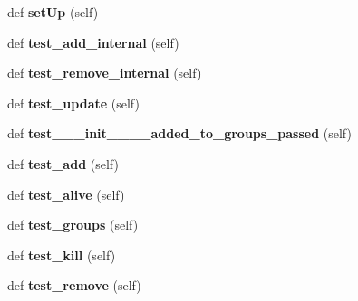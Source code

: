 \begin{DoxyCompactItemize}
\item 
\mbox{\label{classpygame_1_1tests_1_1sprite__test_1_1_sprite_base_ab02727979a1981d7452d4f9dbb3757b3}} 
def {\bfseries set\+Up} (self)
\item 
\mbox{\label{classpygame_1_1tests_1_1sprite__test_1_1_sprite_base_aafa95639b2bce17d3a0b07e5dfcf3b41}} 
def {\bfseries test\+\_\+add\+\_\+internal} (self)
\item 
\mbox{\label{classpygame_1_1tests_1_1sprite__test_1_1_sprite_base_ae76515039f1c8b0852e191bbc3217843}} 
def {\bfseries test\+\_\+remove\+\_\+internal} (self)
\item 
\mbox{\label{classpygame_1_1tests_1_1sprite__test_1_1_sprite_base_a4267f71681e73c1adafd3e4ff14b7b8f}} 
def {\bfseries test\+\_\+update} (self)
\item 
\mbox{\label{classpygame_1_1tests_1_1sprite__test_1_1_sprite_base_a26c4a2fb5d663d12b7dc01af744ae1a2}} 
def {\bfseries test\+\_\+\+\_\+\+\_\+init\+\_\+\+\_\+\+\_\+\+\_\+added\+\_\+to\+\_\+groups\+\_\+passed} (self)
\item 
\mbox{\label{classpygame_1_1tests_1_1sprite__test_1_1_sprite_base_a855556e5792af509e777d415541c5f7d}} 
def {\bfseries test\+\_\+add} (self)
\item 
\mbox{\label{classpygame_1_1tests_1_1sprite__test_1_1_sprite_base_a76e45f65317ccbc82e87f5bd0326fb10}} 
def {\bfseries test\+\_\+alive} (self)
\item 
\mbox{\label{classpygame_1_1tests_1_1sprite__test_1_1_sprite_base_ae902762c8e51fc349edfdabc798d6ebf}} 
def {\bfseries test\+\_\+groups} (self)
\item 
\mbox{\label{classpygame_1_1tests_1_1sprite__test_1_1_sprite_base_a7787d01560cc7653588dc34fbd2b6296}} 
def {\bfseries test\+\_\+kill} (self)
\item 
\mbox{\label{classpygame_1_1tests_1_1sprite__test_1_1_sprite_base_a483b6358033f2d497bdbe91fff9e79ec}} 
def {\bfseries test\+\_\+remove} (self)
\end{DoxyCompactItemize}
